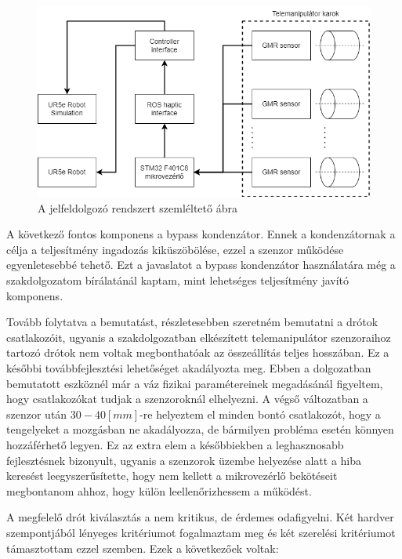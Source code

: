 \begin{figure}[!ht]
\centering
\includegraphics[width=125mm, keepaspectratio]{figures/Diagrammok/Telemanipulator_teljesrendszer}
\caption{A jelfeldolgozó rendszert szemléltető ábra}
\label{fig:Telemanipulator_teljesrendszer}
\end{figure}

A következő fontos komponens a bypass kondenzátor. Ennek a kondenzátornak a célja a teljesítmény ingadozás kiküszöbölése, ezzel a szenzor működése egyenletesebbé tehető. Ezt a javaslatot a bypass kondenzátor használatára még a szakdolgozatom bírálatánál kaptam, mint lehetséges teljesítmény javító komponens.

Tovább folytatva a bemutatást, részletesebben szeretném bemutatni a drótok csatlakozóit, ugyanis a szakdolgozatban elkészített telemanipulátor szenzoraihoz tartozó drótok nem voltak megbonthatóak az összeállítás teljes hosszában. Ez a későbbi továbbfejlesztési lehetőséget akadályozta meg. Ebben a dolgozatban bemutatott eszköznél már a váz fizikai paramétereinek megadásánál figyeltem, hogy csatlakozókat tudjak a szenzoroknál elhelyezni. A végső változatban a szenzor után $30-40[mm]$-re helyeztem el minden bontó csatlakozót, hogy a tengelyeket a mozgásban ne akadályozza, de bármilyen probléma esetén könnyen hozzáférhető legyen. Ez az extra elem a későbbiekben a leghasznosabb fejlesztésnek bizonyult, ugyanis a szenzorok üzembe helyezése alatt a hiba keresést leegyszerűsítette, hogy nem kellett a mikrovezérlő bekötéseit megbontanom ahhoz, hogy külön leellenőrizhessem a működést.

A megfelelő drót kiválasztás a nem kritikus, de érdemes odafigyelni. Két hardver szempontjából lényeges kritériumot fogalmaztam meg és két szerelési kritériumot támasztottam ezzel szemben. Ezek a következőek voltak:

